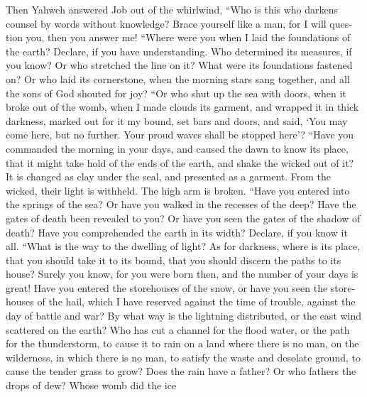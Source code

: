 \begin{paracol}{2}
\begin{otherlanguage}{english}
 Then Yahweh answered Job out of the whirlwind,
 ``Who is this who darkens counsel by words without
knowledge?  Brace yourself like a man, for I will question
you, then you answer me!  ``Where were you when I laid the
foundations of the earth? Declare, if you have understanding.
 Who determined its measures, if you know? Or who
stretched the line on it?  What were its foundations
fastened on? Or who laid its cornerstone,  when the
morning stars sang together, and all the sons of God shouted for joy?
 ``Or who shut up the sea with doors, when it broke out of
the womb,  when I made clouds its garment, and wrapped it
in thick darkness,  marked out for it my bound, set bars
and doors,  and said, `You may come here, but no further.
Your proud waves shall be stopped here'?  ``Have you
commanded the morning in your days, and caused the dawn to know its
place,  that it might take hold of the ends of the earth,
and shake the wicked out of it?  It is changed as clay
under the seal, and presented as a garment.  From the
wicked, their light is withheld. The high arm is broken. 
``Have you entered into the springs of the sea? Or have you walked in
the recesses of the deep?  Have the gates of death been
revealed to you? Or have you seen the gates of the shadow of death?
 Have you comprehended the earth in its width? Declare,
if you know it all.  ``What is the way to the dwelling of
light? As for darkness, where is its place,  that you
should take it to its bound, that you should discern the paths to its
house?  Surely you know, for you were born then, and the
number of your days is great!  Have you entered the
storehouses of the snow, or have you seen the storehouses of the hail,
 which I have reserved against the time of trouble,
against the day of battle and war?  By what way is the
lightning distributed, or the east wind scattered on the earth?
 Who has cut a channel for the flood water, or the path
for the thunderstorm,  to cause it to rain on a land
where there is no man, on the wilderness, in which there is no man,
 to satisfy the waste and desolate ground, to cause the
tender grass to grow?  Does the rain have a father? Or
who fathers the drops of dew?  Whose womb did the ice

\end{otherlanguage}
\end{paracol}
